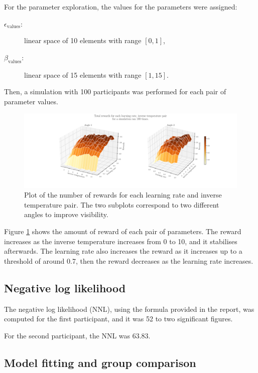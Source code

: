 \documentclass[12pt]{article}
\begin{document}
For the parameter exploration, the values for the parameters were assigned:

\begin{description}
\item[$\epsilon_{\mathrm{values}}$:] linear space of 10 elements with range $[0, 1]$, 
\item[$\beta_{\mathrm{values}}$:] linear space of 15 elements with range $[1, 15]$.
\end{description}

Then, a simulation with 100 participants was performed for each pair of parameter values. 

\begin{figure}[h!]
	\centering
	\hspace*{-2.2in}
	\includegraphics[width=1.5\linewidth]{figures/2.3.pdf}
	\caption{Plot of the number of rewards for each learning rate and inverse temperature pair. The two subplots correspond to two different angles to improve visibility.}
	\label{fig:2.3}
\end{figure}

Figure \ref{fig:2.3} shows the amount of reward of each pair of parameters. The reward increases as the inverse temperature increases from 0 to 10, and it stabilises afterwards. The learning rate also increases the reward as it increases up to a threshold of around 0.7, then the reward decreases as the learning rate increases.

\subsection{Negative log likelihood}

The negative log likelihood (NNL), using the formula provided in the report, was computed for the first participant, and it was 52 to two significant figures. 

For the second participant, the NNL was 63.83.

\subsection{Model fitting and group comparison}
\end{document}
